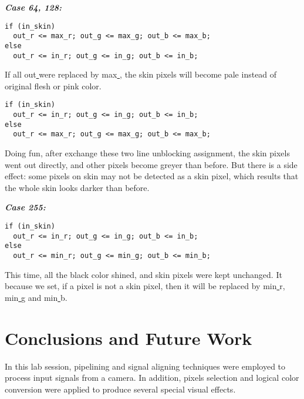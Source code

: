 \documentclass[12pt,fleqn]{article}
\begin{document}
\textbf{\emph{Case 64, 128:}}\\
{\linespread{0.75}
\begin{lstlisting}
if (in_skin)
  out_r <= max_r; out_g <= max_g; out_b <= max_b;
else
  out_r <= in_r; out_g <= in_g; out_b <= in_b;
\end{lstlisting}
\par}
If all out\underline{ } were replaced by max\underline{ }, the skin pixels will become pale instead of original flesh or pink color.
{\linespread{0.75}
\begin{lstlisting}
if (in_skin)
  out_r <= in_r; out_g <= in_g; out_b <= in_b;
else
  out_r <= max_r; out_g <= max_g; out_b <= max_b;
\end{lstlisting}
\par}
Doing fun, after exchange these two line unblocking assignment, the skin pixels went out directly, and other pixels become greyer than before. But there is a side effect: some pixels on skin may not be detected as a skin pixel, which results that the whole skin looks darker than before. 

\textbf{\emph{Case 255:}}\\
{\linespread{0.75}
\begin{lstlisting}
if (in_skin)
  out_r <= in_r; out_g <= in_g; out_b <= in_b;
else
  out_r <= min_r; out_g <= min_g; out_b <= min_b;
\end{lstlisting}
\par}
This time, all the black color shined, and skin pixels were kept unchanged. It because we set, if a pixel is not a skin pixel, then it will be replaced by min\underline{ }r, min\underline{ }g and min\underline{ }b.
 
\section{Conclusions and Future Work}
\label{sec:concl}
In this lab session, pipelining and signal aligning techniques were employed to process input signals from a camera. In addition, pixels selection and logical color conversion were applied to produce several special visual effects.

\end{document}
